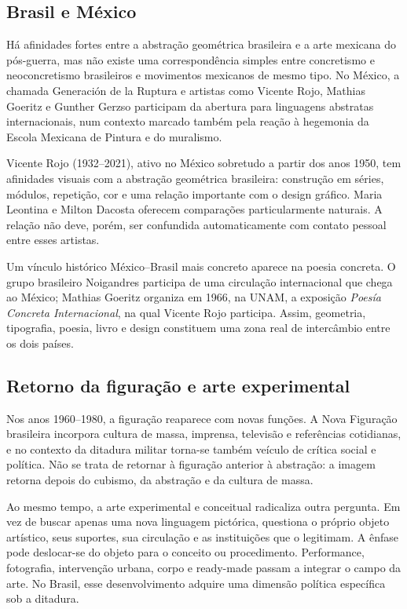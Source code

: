 \subsection{Brasil e México}
\label{subsection-brasil-mexico}

Há afinidades fortes entre a abstração geométrica brasileira e a arte mexicana
do pós-guerra, mas não existe uma correspondência simples entre concretismo e
neoconcretismo brasileiros e movimentos mexicanos de mesmo tipo. No México,
a chamada Generación de la Ruptura e artistas como Vicente Rojo, Mathias
Goeritz e Gunther Gerzso participam da abertura para linguagens abstratas
internacionais, num contexto marcado também pela reação à hegemonia da Escola
Mexicana de Pintura e do muralismo.

Vicente Rojo (1932--2021), ativo no México sobretudo a partir dos anos 1950,
tem afinidades visuais com a abstração geométrica brasileira: construção em
séries, módulos, repetição, cor e uma relação importante com o design gráfico.
Maria Leontina e Milton Dacosta oferecem comparações particularmente naturais.
A relação não deve, porém, ser confundida automaticamente com contato pessoal
entre esses artistas.

Um vínculo histórico México--Brasil mais concreto aparece na poesia concreta.
O grupo brasileiro Noigandres participa de uma circulação internacional que
chega ao México; Mathias Goeritz organiza em 1966, na UNAM, a exposição
\emph{Poesía Concreta Internacional}, na qual Vicente Rojo participa. Assim,
geometria, tipografia, poesia, livro e design constituem uma zona real de
intercâmbio entre os dois países.

\subsection{Retorno da figuração e arte experimental}
\label{subsection-figuracao-experimental}

Nos anos 1960--1980, a figuração reaparece com novas funções. A Nova Figuração
brasileira incorpora cultura de massa, imprensa, televisão e referências
cotidianas, e no contexto da ditadura militar torna-se também veículo de
crítica social e política. Não se trata de retornar à figuração anterior à
abstração: a imagem retorna depois do cubismo, da abstração e da cultura de
massa.

Ao mesmo tempo, a arte experimental e conceitual radicaliza outra pergunta. Em
vez de buscar apenas uma nova linguagem pictórica, questiona o próprio objeto
artístico, seus suportes, sua circulação e as instituições que o legitimam. A
ênfase pode deslocar-se do objeto para o conceito ou procedimento. Performance,
fotografia, intervenção urbana, corpo e ready-made passam a integrar o campo da
arte. No Brasil, esse desenvolvimento adquire uma dimensão política específica
sob a ditadura.

